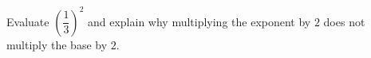 Evaluate $\left(\dfrac{1}{3}\right)^2$ and explain why multiplying the exponent by $2$ does not multiply the base by $2$.
